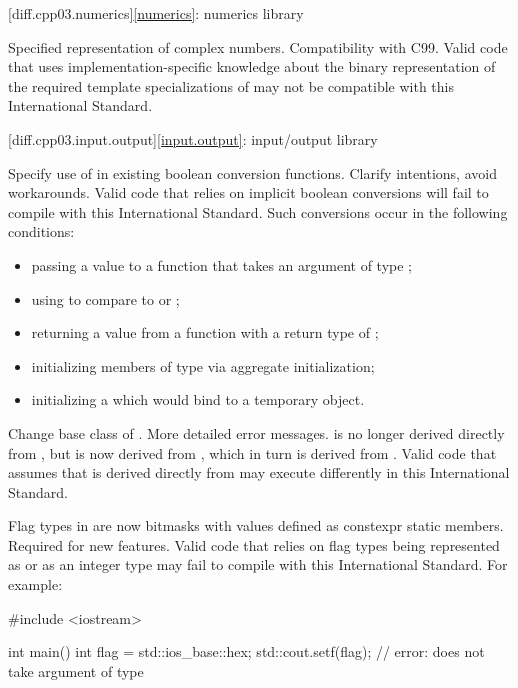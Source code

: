 [diff.cpp03.numerics]{\ref{numerics}: numerics library}

\change
Specified representation of complex numbers.
\rationale
Compatibility with C99.
\effect
Valid \CppIII{} code that uses implementation-specific knowledge about the
binary representation of the required template specializations of
 may not be compatible with this International Standard.

[diff.cpp03.input.output]{\ref{input.output}: input/output library}

\change
Specify use of  in existing boolean conversion functions.
\rationale
Clarify intentions, avoid workarounds.
\effect
Valid \CppIII{} code that relies on implicit boolean conversions will fail to
compile with this International Standard. Such conversions occur in the
following conditions:

\begin{itemize}
\item passing a value to a function that takes an argument of type ;
\item using  to compare to  or ;
\item returning a value from a function with a return type of ;
\item initializing members of type  via aggregate initialization;
\item initializing a  which would bind to a temporary object.
\end{itemize}

\change
Change base class of .
\rationale
More detailed error messages.
\effect
{} is no longer derived directly from
, but is now derived from ,
which in turn is derived from . Valid \CppIII{} code
that assumes that  is derived directly from
 may execute differently in this International Standard.

\change
Flag types in  are now bitmasks with values
defined as constexpr static members.
\rationale
Required for new features.
\effect
Valid \CppIII{} code that relies on  flag types being
represented as  or as an integer type may fail to compile
with this International Standard. For example:
\begin{codeblock}
#include <iostream>

int main() {
  int flag = std::ios_base::hex;
  std::cout.setf(flag);         // error:  does not take argument of type 
}
\end{codeblock}


